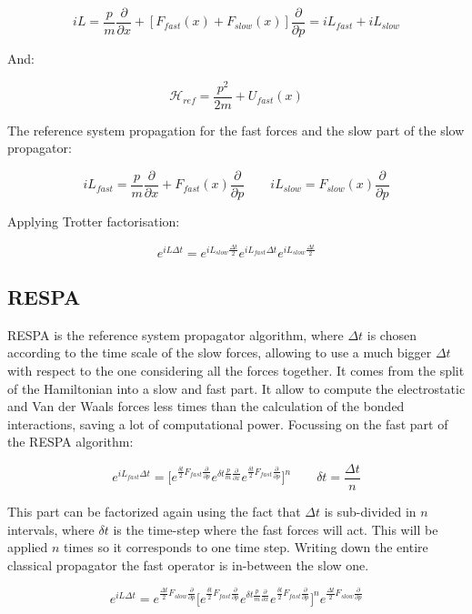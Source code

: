 	$$iL = \frac{p}{m}\frac{\partial }{\partial x} + [F_{fast}(x) + F_{slow}(x)]\frac{\partial}{\partial p} = iL_{fast} + iL_{slow}$$

	And:

	$$\mathcal{H}_{ref} = \frac{p^2}{2m} + U_{fast}(x)$$

	The reference system propagation for the fast forces and the slow part of the slow propagator:

	$$iL_{fast} = \frac{p}{m}\frac{\partial}{\partial x} + F_{fast}(x)\frac{\partial}{\partial p}\qquad iL_{slow} = F_{slow}(x)\frac{\partial}{\partial p}$$

	Applying Trotter factorisation:

	$$e^{iL\Delta t} = e^{iL_{slow}\frac{\Delta t}{2}}e^{iL_{fast}\Delta t}e^{iL_{slow}\frac{\Delta t}{2}}$$

	\subsection{RESPA}
	RESPA is the reference system propagator algorithm, where $\Delta t$ is chosen according to the time scale of the slow forces, allowing to use a much bigger $\Delta t$ with respect to the one considering all the forces together.
	It comes from the split of the Hamiltonian into a slow and fast part.
	It allow to compute the electrostatic and Van der Waals forces less times than the calculation of the bonded interactions, saving a lot of computational power.
	Focussing on the fast part of the RESPA algorithm:

	$$e^{iL_{fast}\Delta t} = \biggl[e^{\frac{\delta t}{2}F_{fast}\frac{\partial}{\partial p}}e^{\delta t\frac{p}{m}\frac{\partial}{\partial x}}e^{\frac{\delta t}{2}F_{fast}\frac{\partial}{\partial p}}\biggr]^n\qquad \delta t = \frac{\Delta t}{n}$$

	This part can be factorized again using the fact that $\Delta t$ is sub-divided in $n$ intervals, where $\delta t$ is the time-step where the fast forces will act.
	This will be applied $n$ times so it corresponds to one time step.
	Writing down the entire classical propagator the fast operator is in-between the slow one.

	$$e^{iL\Delta t} = e^{\frac{\Delta t}{2}F_{slow}\frac{\partial}{\partial p}}\biggl[e^{\frac{\delta t}{2}F_{fast}\frac{\partial}{\partial p}}e^{\delta t\frac{p}{m}\frac{\partial}{\partial x}}e^{\frac{\delta t}{2}F_{fast}\frac{\partial}{\partial p}}\biggr]^ne^{\frac{\Delta t}{2}F_{slow}\frac{\partial}{\partial p}}$$

